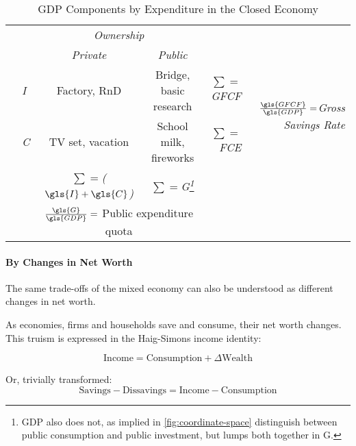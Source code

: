 \begin{landscape}%
\begin{table}
	\caption{GDP Components by Expenditure in the Closed Economy}
	\label{tab:GDP-Comp-Exp}
	\small
	\begin{center}
	\renewcommand{\arraystretch}{1.5}
	\begin{tabular}{llccrr}
		\toprule
		& & \multicolumn{2}{c}{\emph{Ownership}} & &\\
		\cmidrule(r){3-4}
		& &\emph{Private} & \emph{Public}& &\\
		\midrule
		\multirow{2}{*}{\emph{}} & \emph{\gls{I}} & Factory,  \gls{RnD} & Bridge, basic research & \emph{$\sum=$\gls{GFCF}} & \multirow{2}{*}{\emph{$\frac{\gls{GFCF}}{\gls{GDP}}=$Gross Savings Rate}}\\
		& \emph{\gls{C}} & TV set, vacation & School milk, fireworks & \emph{$\sum=$\gls{FCE}}  \\
		\midrule
		& &\emph{$\sum=$($\gls{I}+\gls{C}$)} & \emph{$\sum=$\gls{G}\footnote{\Gls{GDP} also does not, as implied in \autoref{fig:coordinate-space} distinguish between public consumption and public investment, but lumps both together in \gls{G}.}}\\
		\cmidrule(r){3-4}
		& & \multicolumn{2}{c}{$\frac{\gls{G}}{\gls{GDP}}=$ Public expenditure quota} \\
		\bottomrule
	\end{tabular}
	\end{center}
\end{table}
\end{landscape}

\paragraph{By Changes in Net Worth}  \label{sec:delta-net-worth} The same trade-offs of the mixed economy can also be understood as different changes in net worth. 

As economies, firms and households save and consume, their net worth changes. This truism is expressed in the Haig-Simons income identity:

\begin{equation} \label{eq:haig-simons}
			\text{Income}=\text{Consumption}+\Delta\text{Wealth}
\end{equation}

Or, trivially transformed:
\begin{equation} \label{eq:haig-simons-trade-off}
			\text{Savings}-\text{Dissavings}=\text{Income}-\text{Consumption}
\end{equation}

